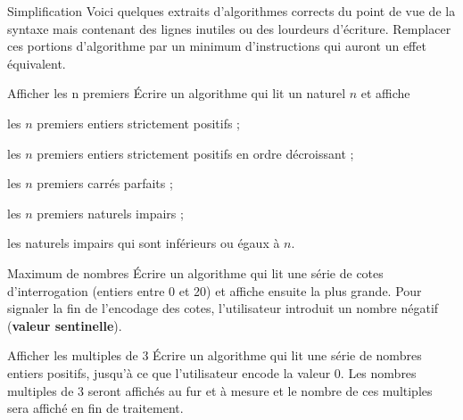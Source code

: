 \bigskip
\bigskip
\begin{Exercice}{Simplification}
	Voici quelques extraits d’algorithmes corrects du point de vue de la
	syntaxe mais contenant des lignes inutiles ou des lourdeurs d’écriture.
	Remplacer ces portions d’algorithme par un minimum d’instructions qui
	auront un effet équivalent.




\end{Exercice}

\begin{Exercice}{Afficher les n premiers}
	Écrire un algorithme qui lit un naturel $n$ et affiche
	
	\begin{liste}
	\item {
	les $n$ premiers entiers strictement positifs ;}
	\item {
	les $n$ premiers entiers strictement positifs en ordre décroissant ;}
	\item {
	les $n$ premiers carrés parfaits ;}
	\item {
	les $n$ premiers naturels impairs ;}
	\item {
	les naturels impairs qui sont inférieurs ou égaux à $n$.}
	\end{liste}
\end{Exercice}

\begin{Exercice}{Maximum de nombres}
	Écrire un algorithme qui lit une série de cotes d’interrogation (entiers
	entre 0 et 20) et affiche ensuite la plus grande. Pour signaler la fin
	de l’encodage des cotes, l’utilisateur introduit un nombre négatif
	(\textbf{valeur sentinelle}).
\end{Exercice}

\begin{Exercice}{Afficher les multiples de 3}
	Écrire un algorithme qui lit une série de nombres entiers positifs,
	jusqu’à ce que l’utilisateur encode la valeur 0. Les nombres multiples
	de 3 seront affichés au fur et à mesure et le nombre de ces multiples
	sera affiché en fin de traitement.
\end{Exercice}

